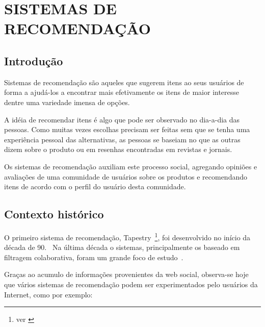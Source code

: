 \chapter{SISTEMAS DE RECOMENDAÇÃO} %
\label{cha:sistemas_de_recomendação}

\section{Introdução}
Sistemas de recomendação são aqueles que sugerem itens ao seus usuários de forma a ajudá-los a encontrar mais efetivamente os itens de maior interesse dentre uma variedade imensa de opções.

A idéia de recomendar itens é algo que pode ser observado no dia-a-dia das pessoas. Como muitas vezes escolhas precisam ser feitas sem que se tenha uma experiência pessoal das alternativas, as pessoas se baseiam no que as outras dizem sobre o produto ou em resenhas encontradas em revistas e jornais.

Os sistemas de recomendação auxiliam este processo social, agregando opiniões e avaliações de uma comunidade de usuários sobre os produtos e recomendando itens de acordo com o perfil do usuário desta comunidade.

\section{Contexto histórico}
O primeiro sistema de recomendação, Tapestry~\footnote{ver \cite{Goldberg92}}, foi desenvolvido no início da década de 90.~\cite{Resnick97} Na última década o sistemas, principalmente os baseado em filtragem colaborativa, foram um grande foco de estudo~\cite{Herlocker04}.

Graças ao acumulo de informações provenientes da web social, observa-se hoje que vários sistemas de recomendação podem ser experimentados pelo usuários da Internet, como por exemplo:

